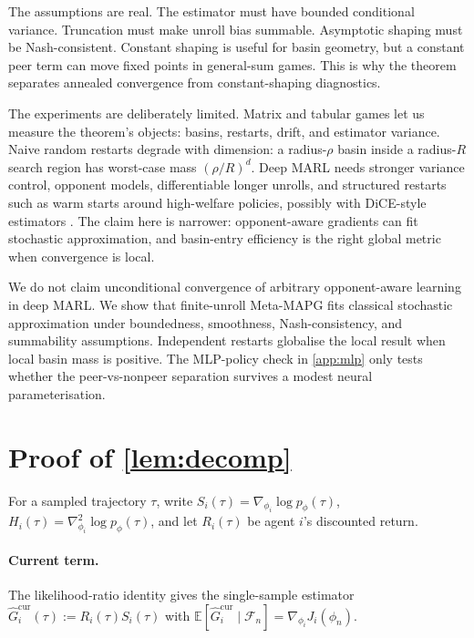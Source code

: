 \documentclass{nextgame2026} %
\newcommand{\E}{\mathbb{E}}
\newcommand{\F}{\mathcal{F}}
\begin{document}
The assumptions are real. The estimator must have bounded conditional variance. Truncation must make unroll bias summable. Asymptotic shaping must be Nash-consistent. Constant shaping is useful for basin geometry, but a constant peer term can move fixed points in general-sum games. This is why the theorem separates annealed convergence from constant-shaping diagnostics.

The experiments are deliberately limited. Matrix and tabular games let us measure the theorem's objects: basins, restarts, drift, and estimator variance. Naive random restarts degrade with dimension: a radius-$\rho$ basin inside a radius-$R$ search region has worst-case mass $(\rho/R)^d$. Deep MARL needs stronger variance control, opponent models, differentiable longer unrolls, and structured restarts such as warm starts around high-welfare policies, possibly with DiCE-style estimators \citep{foerster2018dice}. The claim here is narrower: opponent-aware gradients can fit stochastic approximation, and basin-entry efficiency is the right global metric when convergence is local.

We do not claim unconditional convergence of arbitrary opponent-aware learning in deep MARL. We show that finite-unroll Meta-MAPG fits classical stochastic approximation under boundedness, smoothness, Nash-consistency, and summability assumptions. Independent restarts globalise the local result when local basin mass is positive. The MLP-policy check in \cref{app:mlp} only tests whether the peer-vs-nonpeer separation survives a modest neural parameterisation.

\appendix

\section{Proof of \texorpdfstring{\cref{lem:decomp}}{Lemma 4.1}}\label{app:decomp}

For a sampled trajectory $\tau$, write $S_i(\tau)=\nabla_{\phi_i}\log p_\phi(\tau)$, $H_i(\tau)=\nabla_{\phi_i}^2\log p_\phi(\tau)$, and let $R_i(\tau)$ be agent $i$'s discounted return.

\paragraph{Current term.}
The likelihood-ratio identity \citep{williams1992simple,sutton2018reinforcement} gives the single-sample estimator
$\widehat G_i^{\mathrm{cur}}(\tau):=R_i(\tau)S_i(\tau)$ with $\E[\widehat G_i^{\mathrm{cur}}\mid\F_n]=\nabla_{\phi_i}J_i(\phi_n)$.
\end{document}
